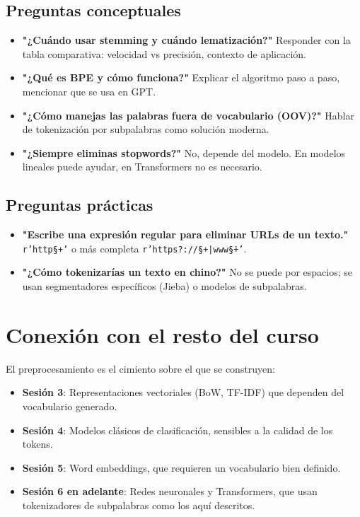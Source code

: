 \documentclass[12pt,a4paper,openany,oneside]{book}
\begin{document}
\subsection{Preguntas conceptuales}
\begin{itemize}
    \item \textbf{"¿Cuándo usar stemming y cuándo lematización?"}
    Responder con la tabla comparativa: velocidad vs precisión, contexto de aplicación.
    \item \textbf{"¿Qué es BPE y cómo funciona?"}
    Explicar el algoritmo paso a paso, mencionar que se usa en GPT.
    \item \textbf{"¿Cómo manejas las palabras fuera de vocabulario (OOV)?"}
    Hablar de tokenización por subpalabras como solución moderna.
    \item \textbf{"¿Siempre eliminas stopwords?"}
    No, depende del modelo. En modelos lineales puede ayudar, en Transformers no es necesario.
\end{itemize}

\subsection{Preguntas prácticas}
\begin{itemize}
    \item \textbf{"Escribe una expresión regular para eliminar URLs de un texto."}
    \texttt{r'http\S+'} o más completa \texttt{r'https?://\S+|www\.\S+'}.
    \item \textbf{"¿Cómo tokenizarías un texto en chino?"}
    No se puede por espacios; se usan segmentadores específicos (Jieba) o modelos de subpalabras.
\end{itemize}

\section{Conexión con el resto del curso}
El preprocesamiento es el cimiento sobre el que se construyen:
\begin{itemize}
    \item \textbf{Sesión 3}: Representaciones vectoriales (BoW, TF-IDF) que dependen del vocabulario generado.
    \item \textbf{Sesión 4}: Modelos clásicos de clasificación, sensibles a la calidad de los tokens.
    \item \textbf{Sesión 5}: Word embeddings, que requieren un vocabulario bien definido.
    \item \textbf{Sesión 6 en adelante}: Redes neuronales y Transformers, que usan tokenizadores de subpalabras como los aquí descritos.
\end{itemize}
\end{document}
